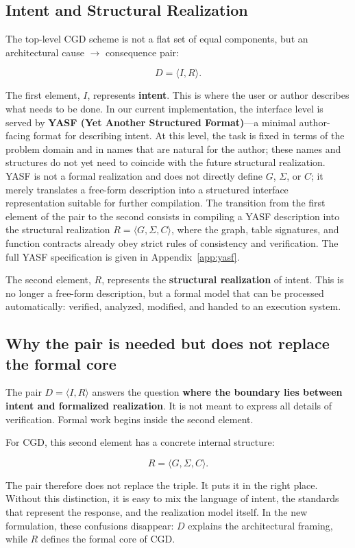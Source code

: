 \documentclass[12pt,a4paper]{article}
\begin{document}
\subsection{Intent and Structural Realization}

The top-level CGD scheme is not a flat set of equal components, but an architectural cause $\to$ consequence pair:


$$D = \langle I, R \rangle.$$

The first element, $I$, represents \textbf{intent}. This is where the user or author describes what needs to be done. In our current implementation, the interface level is served by \textbf{YASF (Yet Another Structured Format)}---a minimal author-facing format for describing intent. At this level, the task is fixed in terms of the problem domain and in names that are natural for the author; these names and structures do not yet need to coincide with the future structural realization. YASF is not a formal realization and does not directly define $G$, $\Sigma$, or $C$; it merely translates a free-form description into a structured interface representation suitable for further compilation. The transition from the first element of the pair to the second consists in compiling a YASF description into the structural realization $R = \langle G, \Sigma, C \rangle$, where the graph, table signatures, and function contracts already obey strict rules of consistency and verification. The full YASF specification is given in Appendix~\ref{app:yasf}.

The second element, $R$, represents the \textbf{structural realization} of intent. This is no longer a free-form description, but a formal model that can be processed automatically: verified, analyzed, modified, and handed to an execution system.

\subsection{Why the pair is needed but does not replace the formal core}

The pair $D = \langle I, R \rangle$ answers the question \textbf{where the boundary lies between intent and formalized realization}. It is not meant to express all details of verification. Formal work begins inside the second element.

For CGD, this second element has a concrete internal structure:


$$R = \langle G, \Sigma, C \rangle.$$

The pair therefore does not replace the triple. It puts it in the right place. Without this distinction, it is easy to mix the language of intent, the standards that represent the response, and the realization model itself. In the new formulation, these confusions disappear: $D$ explains the architectural framing, while $R$ defines the formal core of CGD.
\end{document}
